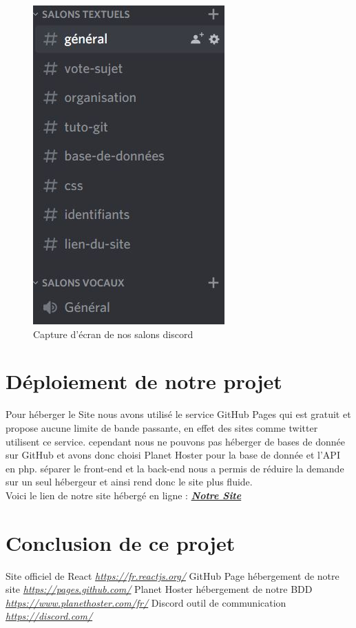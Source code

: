 \documentclass[12pt]{report}
\begin{document}
	\begin{figure}[h!]
	\begin{center}
		\includegraphics[scale=0.5]{discord.jpg}
	\end{center}
		\caption{Capture d'écran de nos salons discord}
\end{figure}

\section{Déploiement de notre projet}
Pour héberger le Site nous avons utilisé le service GitHub\cite{GitHub} Pages qui est gratuit et propose aucune limite de bande passante, en effet des sites comme twitter utilisent ce service.
cependant nous  ne pouvons pas héberger de bases de donnée sur GitHub et avons donc choisi Planet Hoster\cite{Planet} pour la base de donnée et l'API en php. séparer le front-end et la back-end nous a permis de réduire la demande sur un seul hébergeur et ainsi rend donc le site plus fluide.\\
Voici le lien de notre site hébergé en ligne :
\href{https://florentbednarek.github.io/projetwebEISTI}{\textbf{\emph{Notre Site}}}
\clearpage
\section{Conclusion de ce projet}

			\begin{thebibliography}{10}
			Site officiel de React
			\emph{\href{https://fr.reactjs.org/}{https://fr.reactjs.org/}}
			GitHub Page hébergement de notre site
			\emph{\href{https://pages.github.com/}{https://pages.github.com/}} 
			Planet Hoster hébergement de notre BDD
			\emph{\href{https://www.planethoster.com/fr/}{https://www.planethoster.com/fr/}}
			Discord outil de communication
			\emph{\href{https://discord.com/}{https://discord.com/}}
		\end{thebibliography}
\end{document}
